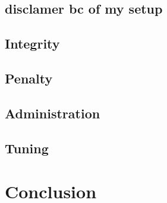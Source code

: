 \documentclass[titlepage, a4paper, 11pt]{scrartcl}
\begin{document}

        \subsection{disclamer bc of my setup}


        \subsection{Integrity}



        \subsection{Penalty}


        \subsection{Administration}


        \subsection{Tuning}


    \section{Conclusion}
    


            
    
\end{document}
